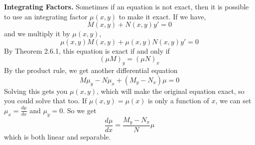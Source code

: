     \textbf{Integrating Factors.} Sometimes if an equation is not exact, then it is possible to use an integrating factor $\mu(x, y)$ to make it exact. If we have,
    \begin{equation*}
        M(x, y) + N(x, y)y' = 0
    \end{equation*}
    and we multiply it by $\mu(x, y)$,
    \begin{equation*}
        \mu(x, y)M(x, y) + \mu(x, y)N(x, y)y' = 0
    \end{equation*}
    By Theorem 2.6.1, this equation is exact if and only if
    \begin{equation*}
        (\mu M)_y = (\mu N)_x
    \end{equation*}
    By the product rule, we get another differential equation
    \begin{equation*}
        M\mu_y - N\mu_x + (M_y - N_x)\mu = 0
    \end{equation*}
    Solving this gets you $\mu(x, y)$, which will make the original equation exact, so you could solve that too.
    \newline \indent
    If $\mu(x, y) = \mu(x)$ is only a function of $x$, we can set $\mu_x = \frac{d\mu}{dx}$ and $\mu_y = 0$. So we get
    \begin{equation*}
        \frac{d\mu}{dx} = \frac{M_y - N_x}{N}\mu
    \end{equation*}
    which is both linear and separable. 